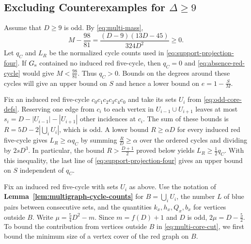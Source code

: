\documentclass[preprint,11pt,numbers]{elsarticle-arxiv}
\numberwithin{equation}{section}
\theoremstyle{definition}
\begin{document}
\subsection{Excluding Counterexamples for \texorpdfstring{$\Delta\geq9$}{Delta >= 9}}\label{subsec:exact-large-degree}

Assume that $D\geq9$ is odd. By \eqref{eq:multi-mass},
\[
 M-\frac{98}{81}=\frac{(D-9)(13D-45)}{324D^2}\geq0.
\]
Let $q_C$ and $L_R$ be the normalized cycle counts used in
\eqref{eq:support-projection-four}. If $G_{\rm s}$ contained no
induced red five-cycle, then $q_C=0$ and \eqref{eq:absence-red-cycle}
would give $M<\frac{98}{81}$. Thus $q_C>0$. Bounds on the degrees around
these cycles will give an upper bound on $S$ and hence a lower bound
on $e=1-\frac{S}{M}$.

Fix an induced red five-cycle $c_0c_1c_2c_3c_4c_0$ and take its
sets $U_i$ from \eqref{eq:odd-core-defs}. Reserving one edge from
$c_i$ to each vertex in $U_{i-1}\cup U_{i+1}$ leaves at most
$s_i=D-|U_{i-1}|-|U_{i+1}|$ other incidences at $c_i$. The sum of
these bounds is $R=5D-2|\bigcup_i U_i|$, which is odd. A lower bound
$R\geq\alpha D$ for every induced red five-cycle gives
$L_R\geq\alpha q_C$ by summing $\frac{R}{D}\geq\alpha$ over the
ordered cycles and dividing by $2sD^3$. In particular, the bound
$R>\frac{D+1}{2}$ proved below yields $L_R\geq\frac{1}{2}q_C$.
With this inequality, the last line of
\eqref{eq:support-projection-four} gives an upper bound on $S$
independent of $q_C$.

Fix an induced red five-cycle with sets $U_i$ as above. Use the
notation of \textbf{Lemma~\ref{lem:multigraph-cycle-counts}} for
$B=\bigcup_iU_i$, the number $L$ of blue pairs between consecutive
sets, and the quantities $k_x,h_x,Q_x,b_x$ for vertices outside $B$.
Write $\mu=\frac{5}{4}D^2-m$. Since $m=f(D)+1$ and $D$ is odd,
$2\mu=D-\frac{5}{2}$. To bound the contribution from vertices
outside $B$ in \eqref{eq:multi-core-cut}, we first bound the minimum
size of a vertex cover of the red graph on $B$.
\end{document}
